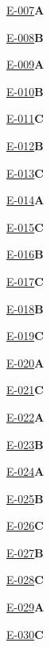 \noindent\hyperref[q:E-007]{E-007}\hfill\textbf{A}\par
\noindent\hyperref[q:E-008]{E-008}\hfill\textbf{B}\par
\noindent\hyperref[q:E-009]{E-009}\hfill\textbf{A}\par
\noindent\hyperref[q:E-010]{E-010}\hfill\textbf{B}\par
\noindent\hyperref[q:E-011]{E-011}\hfill\textbf{C}\par
\noindent\hyperref[q:E-012]{E-012}\hfill\textbf{B}\par
\noindent\hyperref[q:E-013]{E-013}\hfill\textbf{C}\par
\noindent\hyperref[q:E-014]{E-014}\hfill\textbf{A}\par
\noindent\hyperref[q:E-015]{E-015}\hfill\textbf{C}\par
\noindent\hyperref[q:E-016]{E-016}\hfill\textbf{B}\par
\noindent\hyperref[q:E-017]{E-017}\hfill\textbf{C}\par
\noindent\hyperref[q:E-018]{E-018}\hfill\textbf{B}\par
\noindent\hyperref[q:E-019]{E-019}\hfill\textbf{C}\par
\noindent\hyperref[q:E-020]{E-020}\hfill\textbf{A}\par
\noindent\hyperref[q:E-021]{E-021}\hfill\textbf{C}\par
\noindent\hyperref[q:E-022]{E-022}\hfill\textbf{A}\par
\noindent\hyperref[q:E-023]{E-023}\hfill\textbf{B}\par
\noindent\hyperref[q:E-024]{E-024}\hfill\textbf{A}\par
\noindent\hyperref[q:E-025]{E-025}\hfill\textbf{B}\par
\noindent\hyperref[q:E-026]{E-026}\hfill\textbf{C}\par
\noindent\hyperref[q:E-027]{E-027}\hfill\textbf{B}\par
\noindent\hyperref[q:E-028]{E-028}\hfill\textbf{C}\par
\noindent\hyperref[q:E-029]{E-029}\hfill\textbf{A}\par
\noindent\hyperref[q:E-030]{E-030}\hfill\textbf{C}\par
